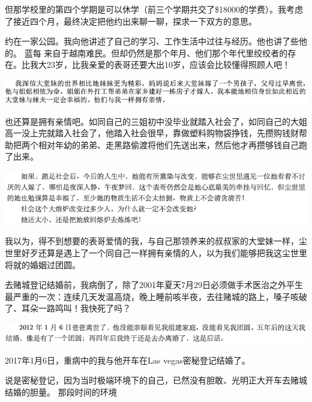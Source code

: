 \documentclass[9pt, b5paper]{article}
\begin{document}
但那学校里的第四个学期是可以休学（前三个学期共交了\$18000的学费）。我考虑了接近四个月，最终决定把他约出来聊一聊，探求一下双方的意思。

约在一家公园。我向他讲述了自己的学习、工作生活中过往与经历。他也讲了些他的。 
蓝每 
来自于越南难民。但却仍然是那个年月、他们那个年代里绞绞者的存在。比我大23岁，比我亲爱的表哥还要大出10岁，应该会比较懂得照顾人吧！

\begin{center}
\includegraphics[width=.9\linewidth]{./pic/backups_plans_20210423_211802.png}
\end{center}

也还算是拥有亲情吧。如同自己的三姐初中没毕业就踏入社会了，如同自己的大姐高一没上完就踏入社会了，他踏入社会很早，靠做塑料购物袋挣钱，先攒购钱财帮助把两个相对年幼的弟弟、走黑路偷渡将他们先送出来，然后他才再攒够钱自己跑了出来。

\begin{center}
\includegraphics[width=.9\linewidth]{./pic/backups_plans_20210423_213157.png}
\end{center}

我以为，得不到想要的表哥爱情的我，与自己那领养来的叔叔家的大堂妹一样，尘世里好歹还算是遇上了一个同自己一样拥有亲情的人，以为我们能够把我这尘世里将就的婚姻过团圆。

去赌城登记结婚前，我病倒了，除了2001年夏天7月29日必须做手术医治之外平生最严重的一次：连续几天发温高烧，晚上睡前咳半夜，去往赌城的路上，嗓子咳破了、耳朵一路鸣叫！我快死了吗？

\begin{center}
\includegraphics[width=.9\linewidth]{./pic/backups_plans_20210423_213744.png}
\end{center}

2017年1月6日，重病中的我与他开车在Las vegas密秘登记结婚了。

说是密秘登记，因为当时极端环境下的自己，已然没有胆敢、光明正大开车去赌城结婚的胆量。
那段时间的环境
\end{document}
